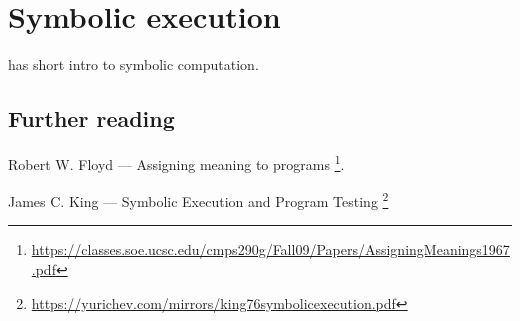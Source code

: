 \chapter{Symbolic execution}

\MathForProg has short intro to symbolic computation.



\section{Further reading}

Robert W. Floyd --- Assigning meaning to programs
\footnote{\url{https://classes.soe.ucsc.edu/cmps290g/Fall09/Papers/AssigningMeanings1967.pdf}}.

James C. King --- Symbolic Execution and Program Testing
\footnote{\url{https://yurichev.com/mirrors/king76symbolicexecution.pdf}}

